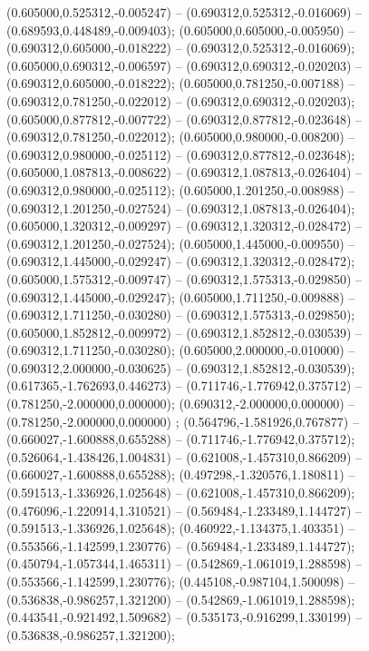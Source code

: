  (0.605000,0.525312,-0.005247) -- (0.690312,0.525312,-0.016069) -- (0.689593,0.448489,-0.009403);
 (0.605000,0.605000,-0.005950) -- (0.690312,0.605000,-0.018222) -- (0.690312,0.525312,-0.016069);
 (0.605000,0.690312,-0.006597) -- (0.690312,0.690312,-0.020203) -- (0.690312,0.605000,-0.018222);
 (0.605000,0.781250,-0.007188) -- (0.690312,0.781250,-0.022012) -- (0.690312,0.690312,-0.020203);
 (0.605000,0.877812,-0.007722) -- (0.690312,0.877812,-0.023648) -- (0.690312,0.781250,-0.022012);
 (0.605000,0.980000,-0.008200) -- (0.690312,0.980000,-0.025112) -- (0.690312,0.877812,-0.023648);
 (0.605000,1.087813,-0.008622) -- (0.690312,1.087813,-0.026404) -- (0.690312,0.980000,-0.025112);
 (0.605000,1.201250,-0.008988) -- (0.690312,1.201250,-0.027524) -- (0.690312,1.087813,-0.026404);
 (0.605000,1.320312,-0.009297) -- (0.690312,1.320312,-0.028472) -- (0.690312,1.201250,-0.027524);
 (0.605000,1.445000,-0.009550) -- (0.690312,1.445000,-0.029247) -- (0.690312,1.320312,-0.028472);
 (0.605000,1.575312,-0.009747) -- (0.690312,1.575313,-0.029850) -- (0.690312,1.445000,-0.029247);
 (0.605000,1.711250,-0.009888) -- (0.690312,1.711250,-0.030280) -- (0.690312,1.575313,-0.029850);
 (0.605000,1.852812,-0.009972) -- (0.690312,1.852812,-0.030539) -- (0.690312,1.711250,-0.030280);
 (0.605000,2.000000,-0.010000) -- (0.690312,2.000000,-0.030625) -- (0.690312,1.852812,-0.030539);
 (0.617365,-1.762693,0.446273) -- (0.711746,-1.776942,0.375712) -- (0.781250,-2.000000,0.000000);
 (0.690312,-2.000000,0.000000) -- (0.781250,-2.000000,0.000000) ;
 (0.564796,-1.581926,0.767877) -- (0.660027,-1.600888,0.655288) -- (0.711746,-1.776942,0.375712);
 (0.526064,-1.438426,1.004831) -- (0.621008,-1.457310,0.866209) -- (0.660027,-1.600888,0.655288);
 (0.497298,-1.320576,1.180811) -- (0.591513,-1.336926,1.025648) -- (0.621008,-1.457310,0.866209);
 (0.476096,-1.220914,1.310521) -- (0.569484,-1.233489,1.144727) -- (0.591513,-1.336926,1.025648);
 (0.460922,-1.134375,1.403351) -- (0.553566,-1.142599,1.230776) -- (0.569484,-1.233489,1.144727);
 (0.450794,-1.057344,1.465311) -- (0.542869,-1.061019,1.288598) -- (0.553566,-1.142599,1.230776);
 (0.445108,-0.987104,1.500098) -- (0.536838,-0.986257,1.321200) -- (0.542869,-1.061019,1.288598);
 (0.443541,-0.921492,1.509682) -- (0.535173,-0.916299,1.330199) -- (0.536838,-0.986257,1.321200);
